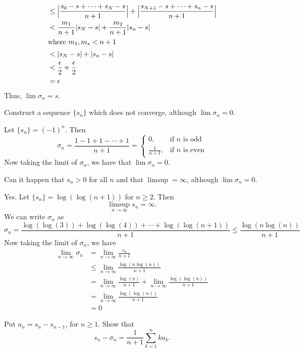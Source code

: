 \begin{exercise}
\begin{exercise}[label = (\alph*), ref = \arabic{exercisei} (\alph*)]
\begin{align*}
      & \leq \Bigl\lvert\frac{s_0 - s + \cdots + s_N - s}{n + 1}\Bigr\rvert +
        \Bigl\lvert\frac{s_{N + 1} - s + \cdots + s_n - s}{n + 1}\Bigr\rvert\\
      & < \frac{m_1}{n + 1}\lvert s_N - s\rvert + \frac{m_2}{n + 1}
        \lvert s_n - s\rvert\\
      \intertext{where \(m_1,m_s < n + 1\)}
      & < \lvert s_N - s\rvert + \lvert s_n - s\rvert\\
      & < \frac{\epsilon}{2} + \frac{\epsilon}{2}\\
      & = \epsilon
    \end{align*}
    Thus, \(\lim\sigma_n = s\).
  \item
    Construct a sequence \(\{s_n\}\) which does not converge, although
    \(\lim\sigma_n = 0\).
    \par\smallskip
    Let \(\{s_n\} = (-1)^n\).
    Then
    \[
    \sigma_n = \frac{1 - 1 + 1 - \cdots + 1}{n + 1} =
    \begin{cases}
      0, & \text{if \(n\) is odd}\\
      \frac{1}{n + 1}, & \text{if \(n\) is even}
    \end{cases}
    \]
    Now taking the limit of \(\sigma_n\), we have that \(\lim\sigma_n = 0\).
  \item
    Can it happen that \(s_n > 0\) for all \(n\) and that \(\limsup = \infty\),
    although \(\lim\sigma_n = 0\).
    \par\smallskip
    Yes.
    Let \(\{s_n\} = \log(\log(n + 1))\) for \(n\geq 2\).
    Then
    \[
    \limsup_{n\to\infty} s_n = \infty.
    \]
    We can write \(\sigma_n\) as
    \[
    \sigma_n = \frac{\log(\log(3)) + \log(\log(4)) + \cdots +
      \log(\log(n + 1))}{n + 1}\leq\frac{\log(n\log(n))}{n + 1}
    \]
    Now taking the limit of \(\sigma_n\), we have
    \begin{align*}
      \lim_{n\to\infty}\sigma_n
      & = \lim_{n\to\infty}\frac{s_n}{n + 1}\\
      & \leq \lim_{n\to\infty}\frac{\log(n\log(n))}{n + 1}\\
      & = \lim_{n\to\infty}\frac{\log(n)}{n + 1} +
        \lim_{n\to\infty}\frac{\log(\log(n))}{n + 1}\\
      & = \lim_{n\to\infty}\frac{\log(\log(n))}{n + 1}\\
      & = 0
    \end{align*}
  \item
    Put \(a_n = s_n - s_{n - 1}\), for \(n\geq 1\).
    Show that
    \[
    s_n - \sigma_n = \frac{1}{n + 1}\sum_{k = 1}^nka_k.
\]
\end{exercise}
\end{exercise}
